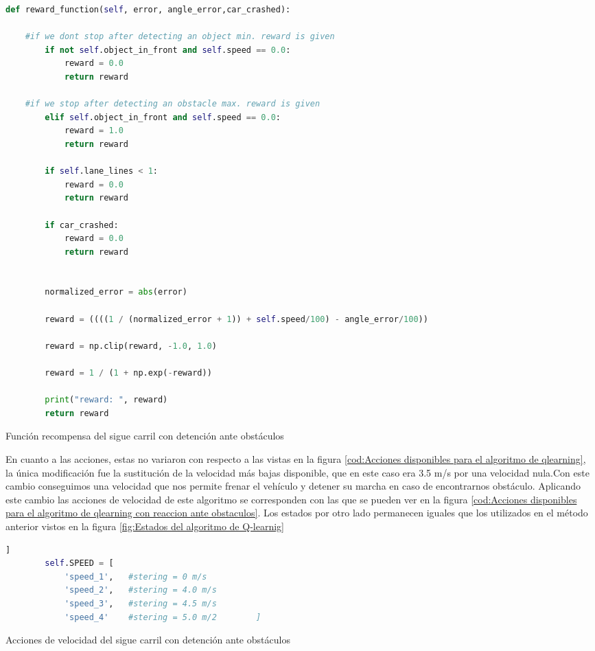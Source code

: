 \begin{code}[H]
	\begin{lstlisting}[language=Python]
    def reward_function(self, error, angle_error,car_crashed):

	#if we dont stop after detecting an object min. reward is given
        if not self.object_in_front and self.speed == 0.0:
            reward = 0.0
            return reward
	
	#if we stop after detecting an obstacle max. reward is given
        elif self.object_in_front and self.speed == 0.0:
            reward = 1.0
            return reward

        if self.lane_lines < 1:
            reward = 0.0
            return reward
        
        if car_crashed:
            reward = 0.0
            return reward


        normalized_error = abs(error)

        reward = ((((1 / (normalized_error + 1)) + self.speed/100) - angle_error/100))

        reward = np.clip(reward, -1.0, 1.0)

        reward = 1 / (1 + np.exp(-reward))

        print("reward: ", reward)
        return reward
	\end{lstlisting}

\caption[Función recompensa del sigue carril con detención ante obstáculos]{Función recompensa del sigue carril con detención ante obstáculos}
\label{cod:Función recompensa del algoritmo con reacción a obstáculos}
\end{code}
\bigskip

En cuanto a las acciones, estas no variaron con respecto a las vistas en la figura \ref{cod:Acciones disponibles para el algoritmo de qlearning}, la única modificación fue la sustitución de la velocidad más bajas disponible, que en este caso era 3.5 m/s por una velocidad nula.Con este cambio conseguimos una velocidad que nos permite frenar el vehículo y detener su marcha en caso de encontrarnos obstáculo. Aplicando este cambio las acciones de velocidad de este algoritmo se corresponden con las que se pueden ver en la figura \ref{cod:Acciones disponibles para el algoritmo de qlearning con reaccion ante obstaculos}. Los estados por otro lado permanecen iguales que los utilizados en el método anterior vistos en la figura \ref{fig:Estados del algoritmo de Q-learnig}


    \bigskip
    \begin{code}[H]
	\begin{lstlisting}[language=Python]
        ]
        self.SPEED = [ 
            'speed_1',   #stering = 0 m/s  
            'speed_2',   #stering = 4.0 m/s  
            'speed_3',   #stering = 4.5 m/s
            'speed_4'    #stering = 5.0 m/2        ]
	\end{lstlisting}
\caption[Acciones de velocidad del sigue carril con detención ante obstáculos]{Acciones de velocidad del sigue carril con detención ante obstáculos}
\label{cod:Acciones disponibles para el algoritmo de qlearning con reaccion ante obstaculos}
\end{code}

